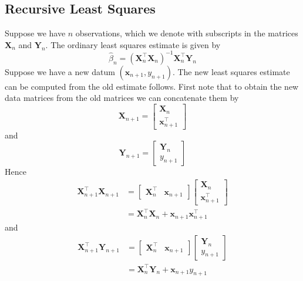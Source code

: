 \documentclass[11pt]{report} %
\begin{document}
\subsection{Recursive Least Squares}

Suppose we have $n$ observations, which we denote with subscripts in the matrices $\mathbf{X}_{n}$ and $\mathbf{Y}_{n}$. The ordinary least squares estimate is given by
\begin{equation}
\hat{\beta}_{n} = \left(\mathbf{X}_{n}^{\top}\mathbf{X}_{n}\right)^{-1}\mathbf{X}_{n}^{\top}\mathbf{Y}_{n}
\end{equation}
Suppose we have a new datum $\left(\mathbf{x}_{n + 1}, y_{n + 1}\right)$. The new least squares estimate can be computed from the old estimate follows. First note that to obtain the new data matrices from the old matrices we can concatenate them by
\begin{equation}
\mathbf{X}_{n + 1} = \begin{bmatrix}
\mathbf{X}_{n} \\ \mathbf{x}_{n + 1}^{\top}
\end{bmatrix}
\end{equation}
and
\begin{equation}
\mathbf{Y}_{n + 1} = \begin{bmatrix}
\mathbf{Y}_{n} \\ y_{n + 1}
\end{bmatrix}
\end{equation}
Hence
\begin{align}
\mathbf{X}_{n + 1}^{\top}\mathbf{X}_{n + 1} &= \begin{bmatrix}
\mathbf{X}_{n}^{\top} & \mathbf{x}_{n + 1}
\end{bmatrix}\begin{bmatrix}
\mathbf{X}_{n} \\ \mathbf{x}_{n + 1}^{\top}
\end{bmatrix} \\
&= \mathbf{X}_{n}^{\top}\mathbf{X}_{n} + \mathbf{x}_{n + 1}\mathbf{x}_{n + 1}^{\top}
\end{align}
and
\begin{align}
\mathbf{X}_{n + 1}^{\top}\mathbf{Y}_{n + 1} &= \begin{bmatrix}
\mathbf{X}_{n}^{\top} & \mathbf{x}_{n + 1}
\end{bmatrix}\begin{bmatrix}
\mathbf{Y}_{n} \\ y_{n + 1}
\end{bmatrix} \\
&= \mathbf{X}_{n}^{\top}\mathbf{Y}_{n} + \mathbf{x}_{n + 1}y_{n + 1}
\end{align}
\end{document}
